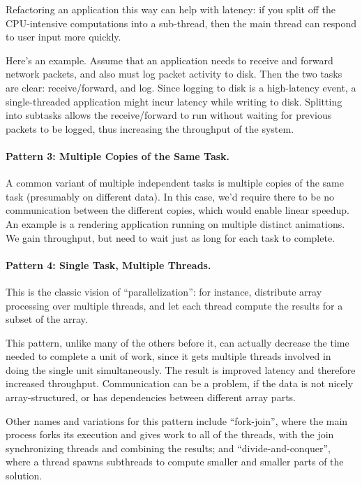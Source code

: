 \documentclass[a4paper]{report}
\begin{document}
Refactoring an application this way can help with latency: if you 
split off the CPU-intensive computations into a sub-thread, then
the main thread can respond to user input more quickly.

Here's an example. Assume that an application needs to receive and
forward network packets, and also must log packet activity to disk.
Then the two tasks are clear: receive/forward, and log. Since logging
to disk is a high-latency event, a single-threaded application might
incur latency while writing to disk. Splitting into subtasks allows
the receive/forward to run without waiting for previous packets to be
logged, thus increasing the throughput of the system.

\paragraph{Pattern 3: Multiple Copies of the Same Task.} A common variant of
multiple independent tasks is multiple copies of the same task
(presumably on different data). In this case, we'd require there to be
no communication between the different copies, which would enable
linear speedup. An example is a rendering application running on
multiple distinct animations. We gain throughput, but need to wait
just as long for each task to complete.

\paragraph{Pattern 4: Single Task, Multiple Threads.} This is the classic
vision of ``parallelization'': for instance, distribute array
processing over multiple threads, and let each thread compute the
results for a subset of the array.

This pattern, unlike many of the others before it, can actually
decrease the time needed to complete a unit of work, since it gets
multiple threads involved in doing the single unit simultaneously.
The result is improved latency and therefore increased throughput.
Communication can be a problem, if the data is not nicely
array-structured, or has dependencies between different array parts.

Other names and variations for this pattern include ``fork-join'',
where the main process forks its execution and gives work to all of
the threads, with the join synchronizing threads and combining the
results; and ``divide-and-conquer'', where a thread spawns subthreads
to compute smaller and smaller parts of the solution.
\end{document}

